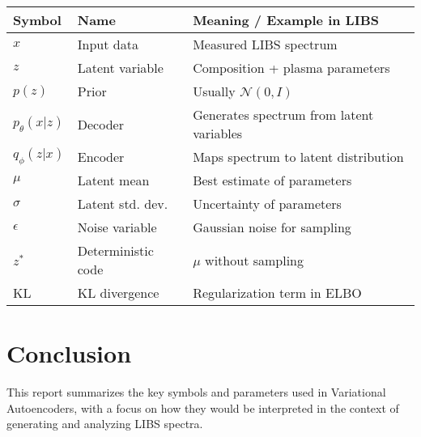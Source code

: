 \documentclass[12pt,a4paper]{article}
\begin{document}
	\begin{center}
		\begin{tabular}{@{}llp{7cm}@{}}
			\toprule
			\textbf{Symbol} & \textbf{Name} & \textbf{Meaning / Example in LIBS} \\
			\midrule
			\( x \) & Input data & Measured LIBS spectrum \\
			\( z \) & Latent variable & Composition + plasma parameters \\
			\( p(z) \) & Prior & Usually \( \mathcal{N}(0, I) \) \\
			\( p_\theta(x|z) \) & Decoder & Generates spectrum from latent variables \\
			\( q_\phi(z|x) \) & Encoder & Maps spectrum to latent distribution \\
			\( \mu \) & Latent mean & Best estimate of parameters \\
			\( \sigma \) & Latent std. dev. & Uncertainty of parameters \\
			\( \epsilon \) & Noise variable & Gaussian noise for sampling \\
			\( z^* \) & Deterministic code & \( \mu \) without sampling \\
			KL & KL divergence & Regularization term in ELBO \\
			\bottomrule
		\end{tabular}
	\end{center}
	
	\section{Conclusion}
	This report summarizes the key symbols and parameters used in Variational Autoencoders, with a focus on how they would be interpreted in the context of generating and analyzing LIBS spectra.
	
\end{document}
